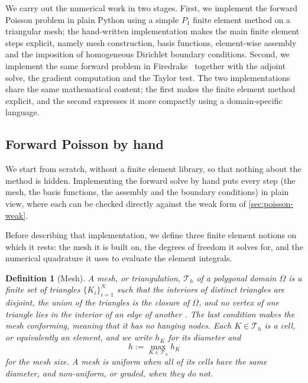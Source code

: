 \documentclass[a4paper,11pt]{article}
\newcommand{\Om}{\Omega}
\theoremstyle{spacedplain} \newtheorem{theorem}[counter]{Theorem} \newtheorem{lemma}[counter]{Lemma} \newtheorem{prop}[counter]{Proposition} \newtheorem{cor}[counter]{Corollary}
\theoremstyle{spaceddefinition} \newtheorem{defn}[counter]{Definition} \newtheorem{example}[counter]{Example} \newtheorem{remark}[counter]{Remark}
\begin{document}
We carry out the numerical work in two stages. First, we implement the forward Poisson problem in plain Python using a simple $P_1$ finite element method on a triangular mesh; the hand-written implementation makes the main finite element steps explicit, namely mesh construction, basis functions, element-wise assembly and the imposition of homogeneous Dirichlet boundary conditions. Second, we implement the same forward problem in Firedrake~\citep{firedrake2016} together with the adjoint solve, the gradient computation and the Taylor test. The two implementations share the same mathematical content; the first makes the finite element method explicit, and the second expresses it more compactly using a domain-specific language.

\subsection{Forward Poisson by hand}
\label{sec:poisson-numerics:byhand}

We start from scratch, without a finite element library, so that nothing about the method is hidden. Implementing the forward solve by hand puts every step (the mesh, the basis functions, the assembly and the boundary conditions) in plain view, where each can be checked directly against the weak form of \cref{sec:poisson-weak}.

Before describing that implementation, we define three finite element notions on which it rests: the mesh it is built on, the degrees of freedom it solves for, and the numerical quadrature it uses to evaluate the element integrals.

\begin{defn}[Mesh]
\label{defn:mesh}
A \emph{mesh}, or \emph{triangulation}, $\mathcal{T}_h$ of a polygonal domain $\Om$ is a finite set of triangles $\{K_i\}_{i=1}^{N}$ such that the interiors of distinct triangles are disjoint, the union of the triangles is the closure of $\Om$, and no vertex of one triangle lies in the interior of an edge of another \citep[Defn.~1.2]{hc2026}. The last condition makes the mesh \emph{conforming}, meaning that it has no hanging nodes. Each $K \in \mathcal{T}_h$ is a \emph{cell}, or equivalently an \emph{element}, and we write $h_K$ for its diameter and
\begin{equation}
  \label{eq:mesh-size}
  h := \max_{K \in \mathcal{T}_h} h_K
\end{equation}
for the \emph{mesh size}. A mesh is \emph{uniform} when all of its cells have the same diameter, and \emph{non-uniform}, or \emph{graded}, when they do not.
\end{defn}
\end{document}
